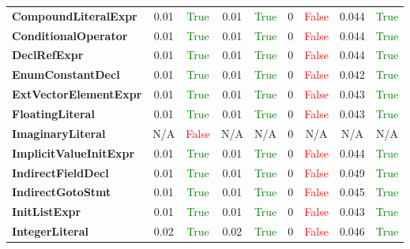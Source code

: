 \documentclass{article}
\begin{document}
\begin{xltabular}{\textwidth}{lcccccccc}
\textbf{{\fontsize{10}{12}\selectfont CompoundLiteralExpr}}& 0.01&\textcolor{green}{True}& 0.01&\textcolor{green}{True}& 0&\textcolor{red}{False}& 0.044&\textcolor{green}{True} \\[0.5ex]
\textbf{{\fontsize{10}{12}\selectfont ConditionalOperator}}& 0.01&\textcolor{green}{True}& 0.01&\textcolor{green}{True}& 0&\textcolor{red}{False}& 0.044&\textcolor{green}{True} \\[0.5ex]
\textbf{{\fontsize{10}{12}\selectfont DeclRefExpr}}& 0.01&\textcolor{green}{True}& 0.01&\textcolor{green}{True}& 0&\textcolor{red}{False}& 0.044&\textcolor{green}{True} \\[0.5ex]
\textbf{{\fontsize{10}{12}\selectfont EnumConstantDecl}}& 0.01&\textcolor{green}{True}& 0.01&\textcolor{green}{True}& 0&\textcolor{red}{False}& 0.042&\textcolor{green}{True} \\[0.5ex]
\textbf{{\fontsize{10}{12}\selectfont ExtVectorElementExpr}}& 0.01&\textcolor{green}{True}& 0.01&\textcolor{green}{True}& 0&\textcolor{red}{False}& 0.043&\textcolor{green}{True} \\[0.5ex]
\textbf{{\fontsize{10}{12}\selectfont FloatingLiteral}}& 0.01&\textcolor{green}{True}& 0.01&\textcolor{green}{True}& 0&\textcolor{red}{False}& 0.043&\textcolor{green}{True} \\[0.5ex]
\textbf{{\fontsize{10}{12}\selectfont ImaginaryLiteral}}& N/A&\textcolor{red}{False}& N/A&N/A& 0&N/A& N/A&N/A \\[0.5ex]
\textbf{{\fontsize{10}{12}\selectfont ImplicitValueInitExpr}}& 0.01&\textcolor{green}{True}& 0.01&\textcolor{green}{True}& 0&\textcolor{red}{False}& 0.044&\textcolor{green}{True} \\[0.5ex]
\textbf{{\fontsize{10}{12}\selectfont IndirectFieldDecl}}& 0.01&\textcolor{green}{True}& 0.01&\textcolor{green}{True}& 0&\textcolor{red}{False}& 0.049&\textcolor{green}{True} \\[0.5ex]
\textbf{{\fontsize{10}{12}\selectfont IndirectGotoStmt}}& 0.01&\textcolor{green}{True}& 0.01&\textcolor{green}{True}& 0&\textcolor{red}{False}& 0.045&\textcolor{green}{True} \\[0.5ex]
\textbf{{\fontsize{10}{12}\selectfont InitListExpr}}& 0.01&\textcolor{green}{True}& 0.01&\textcolor{green}{True}& 0&\textcolor{red}{False}& 0.043&\textcolor{green}{True} \\[0.5ex]
\textbf{{\fontsize{10}{12}\selectfont IntegerLiteral}}& 0.02&\textcolor{green}{True}& 0.02&\textcolor{green}{True}& 0&\textcolor{red}{False}& 0.046&\textcolor{green}{True} \\[0.5ex]

\end{xltabular}
\end{document}
